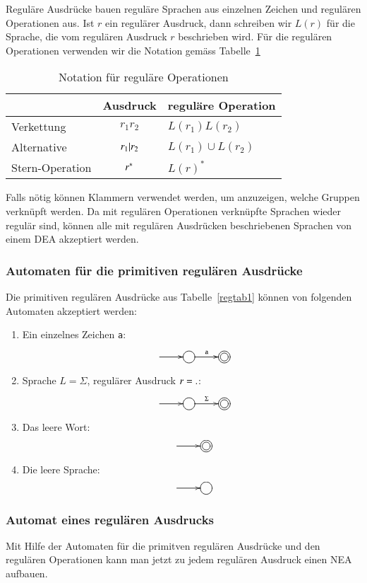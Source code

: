 Reguläre Ausdrücke bauen reguläre Sprachen aus einzelnen
Zeichen und regulären Operationen aus.
Ist $r$ ein regulärer Ausdruck, dann schreiben wir  $L(r)$ für die
Sprache, die vom regulären Ausdruck $r$ beschrieben wird.
Für die regulären Operationen verwenden wir die Notation
gemäss Tabelle~\ref{regtab2}
\begin{table}
\begin{center}
\begin{tabular}{|l|c|l|}
\hline
&Ausdruck&reguläre Operation\\
\hline
\index{Verkettung}%
Verkettung&$r_1r_2$&$L(r_1)L(r_2)$\\
\index{Alternative}%
Alternative&$r_1{\tt |}r_2$&$L(r_1)\cup L(r_2)$\\
\index{*-Operation@$*$-Operation}%
Stern-Operation&$r{\mathstrut^{\tt *}}$&$L(r)^*$\\
\hline
\end{tabular}
\end{center}
\caption{Notation für reguläre Operationen\label{regtab2}}
\end{table}
Falls nötig können Klammern verwendet werden, um anzuzeigen,
welche Gruppen verknüpft werden.
Da mit regulären Operationen
verknüpfte Sprachen wieder regulär sind, können alle mit
regulären Ausdrücken beschriebenen Sprachen von einem DEA
akzeptiert werden.

\subsubsection{Automaten für die primitiven regulären Ausdrücke}
Die primitiven regulären Ausdrücke aus Tabelle~\ref{regtab1} können
von folgenden Automaten akzeptiert werden:
\begin{enumerate}
\item Ein einzelnes Zeichen {\tt a}:
\[
\entrymodifiers={++[o][F]}
\xymatrix{
*+\txt{}\ar[r]
	&{}\ar[r]^{\tt a}
		&*++[o][F=]{}
}
\]
\item Sprache $L=\Sigma$, regulärer Ausdruck $r={\tt .}$:
\[
\entrymodifiers={++[o][F]}
\xymatrix{
*+\txt{}\ar[r]
	&{}\ar[r]^{\Sigma}
		&*++[o][F=]{}
}
\]
\item Das leere Wort:
\[
\entrymodifiers={++[o][F]}
\xymatrix{
*+\txt{}\ar[r]
	&*++[o][F=]{}
}
\]
\item Die leere Sprache:
\[
\entrymodifiers={++[o][F]}
\xymatrix{
*+\txt{}\ar[r]
	&{}
}
\]
\end{enumerate}

\subsubsection{Automat eines regulären Ausdrucks}
Mit Hilfe der Automaten für die primitven regulären Ausdrücke
und den regulären Operationen kann man jetzt zu jedem regulären
Ausdruck einen NEA aufbauen.

